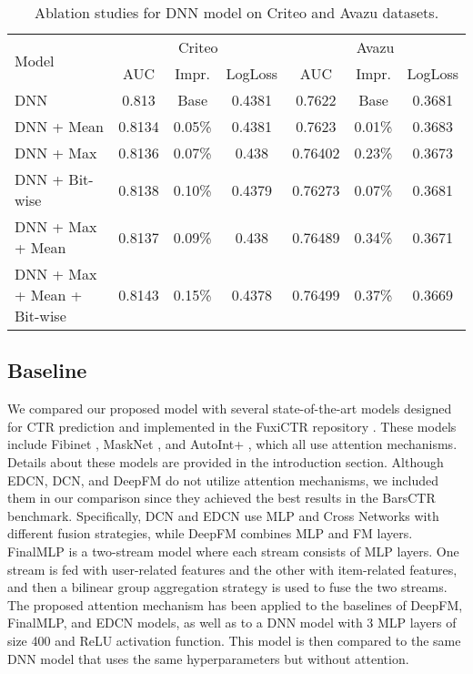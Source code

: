 \documentclass{article}
\begin{document}
\begin{table}[t]
\centering
\caption{Ablation studies for DNN model on Criteo and Avazu datasets.}
\label{table:performance}
\begin{tabular}{lcccccc}
\hline
\multirow{2}{*}{Model}                      & \multicolumn{3}{c}{Criteo} & \multicolumn{3}{c}{Avazu} \\
\cline{2-4} \cline{5-7}
                            & AUC    & Impr.   & LogLoss   & AUC     & Impr.    & LogLoss   \\
\hline \hline
DNN                         & 0.813  & Base    & 0.4381    & 0.7622  & Base    & 0.3681    \\
DNN + Mean                  & 0.8134 & 0.05\%  & 0.4381    & 0.7623  & 0.01\%  & 0.3683    \\
DNN + Max                   & 0.8136 & 0.07\%  & 0.438     & 0.76402 & 0.23\%  & 0.3673    \\
DNN + Bit-wise              & 0.8138 & 0.10\%  & 0.4379    & 0.76273 & 0.07\%  & 0.3681    \\
DNN + Max + Mean            & 0.8137 & 0.09\%  & 0.438     & 0.76489 & 0.34\%  & 0.3671    \\
DNN + Max + Mean + Bit-wise & 0.8143 & 0.15\%  & 0.4378    & 0.76499 & 0.37\%  & 0.3669    \\
\hline
\end{tabular}
\end{table}

\subsection{Baseline}
We compared our proposed model with several state-of-the-art models designed for CTR prediction and implemented in the FuxiCTR repository \cite{zhu2021open}. These models include Fibinet \cite{huang2019fibinet}, MaskNet \cite{wang2021masknet}, and AutoInt+ \cite{song2019autoint}, which all use attention mechanisms. Details about these models are provided in the introduction section. Although EDCN, DCN, and DeepFM \cite{deep&cross, chen2021enhancing, guo2017deepfm} do not utilize attention mechanisms, we included them in our comparison since they achieved the best results in the BarsCTR benchmark. Specifically, DCN and EDCN use MLP and Cross Networks with different fusion strategies, while DeepFM combines MLP and FM layers. FinalMLP \cite{mao2023finalmlp} is a two-stream model where each stream consists of MLP layers. One stream is fed with user-related features and the other with item-related features, and then a bilinear group aggregation strategy is used to fuse the two streams. The proposed attention mechanism has been applied to the baselines of DeepFM, FinalMLP, and EDCN models, as well as to a DNN model with 3 MLP layers of size 400 and ReLU activation function. This model is then compared to the same DNN model that uses the same hyperparameters but without attention.
\end{document}
